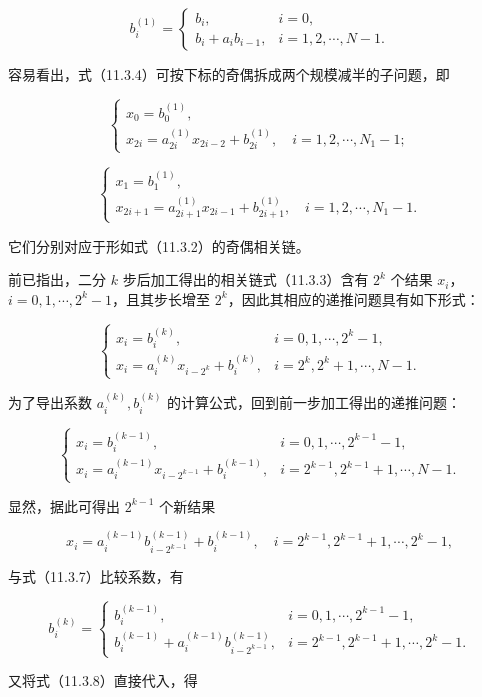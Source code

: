 \documentclass[
  10pt,
  fontset=fandol]{ctexart}
\begin{document}
\[
b_i^{(1)}=
\begin{cases}
b_i,& i=0,\\
b_i+a_i b_{i-1},& i=1,2,\cdots,N-1.
\end{cases}
\tag{11.3.6}
\]

容易看出，式（11.3.4）可按下标的奇偶拆成两个规模减半的子问题，即

\[
\begin{cases}
x_0=b_0^{(1)},\\
x_{2i}=a_{2i}^{(1)}x_{2i-2}+b_{2i}^{(1)},\quad i=1,2,\cdots,N_1-1;
\end{cases}
\]

\[
\begin{cases}
x_1=b_1^{(1)},\\
x_{2i+1}=a_{2i+1}^{(1)}x_{2i-1}+b_{2i+1}^{(1)},\quad i=1,2,\cdots,N_1-1.
\end{cases}
\]

它们分别对应于形如式（11.3.2）的奇偶相关链。

前已指出，二分 \(k\) 步后加工得出的相关链式（11.3.3）含有 \(2^k\) 个结果 \(x_i\)，\(i=0,1,\cdots,2^k-1\)，且其步长增至 \(2^k\)，因此其相应的递推问题具有如下形式：

\[
\begin{cases}
x_i=b_i^{(k)},& i=0,1,\cdots,2^k-1,\\
x_i=a_i^{(k)}x_{i-2^k}+b_i^{(k)},& i=2^k,2^k+1,\cdots,N-1.
\end{cases}
\tag{11.3.7}
\]

为了导出系数 \(a_i^{(k)},b_i^{(k)}\) 的计算公式，回到前一步加工得出的递推问题：

\[
\begin{cases}
x_i=b_i^{(k-1)},& i=0,1,\cdots,2^{k-1}-1,\\
x_i=a_i^{(k-1)}x_{i-2^{k-1}}+b_i^{(k-1)},& i=2^{k-1},2^{k-1}+1,\cdots,N-1.
\end{cases}
\tag{11.3.8}
\]

显然，据此可得出 \(2^{k-1}\) 个新结果

\[
x_i=a_i^{(k-1)}b_{i-2^{k-1}}^{(k-1)}+b_i^{(k-1)},\quad i=2^{k-1},2^{k-1}+1,\cdots,2^k-1,
\]

与式（11.3.7）比较系数，有

\[
b_i^{(k)}=
\begin{cases}
b_i^{(k-1)},& i=0,1,\cdots,2^{k-1}-1,\\
b_i^{(k-1)}+a_i^{(k-1)}b_{i-2^{k-1}}^{(k-1)},& i=2^{k-1},2^{k-1}+1,\cdots,2^k-1.
\end{cases}
\tag{11.3.9}
\]

又将式（11.3.8）直接代入，得
\end{document}
